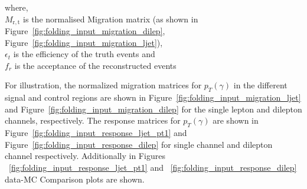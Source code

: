 where, \\
$M_{\mathrm{r,t}}$ is the normalised Migration matrix (as shown in Figure~\ref{fig:folding_input_migration_dilep}, Figure~\ref{fig:folding_input_migration_ljet}),\\
$\epsilon_{t}$ is the efficiency of the truth events and \\
$f_{r}$ is the acceptance of the reconstructed events

\vspace*{20pt}

For illustration, the normalized migration matrices for $p_T(\gamma)$ in the different signal and control regions are shown in Figure~\ref{fig:folding_input_migration_ljet} and Figure~\ref{fig:folding_input_migration_dilep} for the single lepton and dilepton channels, respectively. The response matrices for $p_T(\gamma)$  are shown in Figure~\ref{fig:folding_input_response_ljet_pt1} and Figure~\ref{fig:folding_input_response_dilep} for single channel and dilepton channel respectively. Additionally in Figures ~\ref{fig:folding_input_response_ljet_pt1} and ~\ref{fig:folding_input_response_dilep} data-MC Comparison plots are shown. 





